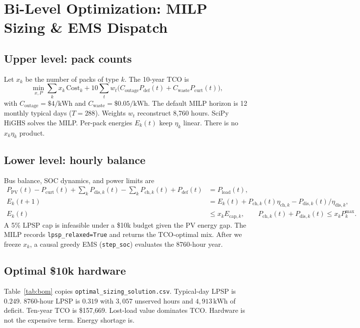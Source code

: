 \documentclass[12pt]{article}
\begin{document}
\section{Bi-Level Optimization: MILP Sizing \& EMS Dispatch}

\subsection{Upper level: pack counts}
Let \(x_k\) be the number of packs of type \(k\). The 10-year TCO is
\begin{equation}
  \min_{x,P}
  \sum_k x_k\,\mathrm{Cost}_k
  + 10\sum_t w_t
    \bigl(C_{\mathrm{outage}} P_{\mathrm{def}}(t)
          + C_{\mathrm{waste}} P_{\mathrm{curt}}(t)\bigr),
\end{equation}
with \(C_{\mathrm{outage}}=\$4/\mathrm{kWh}\) and
\(C_{\mathrm{waste}}=\$0.05/\mathrm{kWh}\). The default MILP horizon is
12 monthly typical days (\(T=288\)). Weights \(w_t\) reconstruct
8{,}760 hours. SciPy HiGHS solves the MILP. Per-pack energies \(E_k(t)\)
keep \(\eta_k\) linear. There is no \(x_k\eta_k\) product.

\subsection{Lower level: hourly balance}
Bus balance, SOC dynamics, and power limits are
\begin{align}
  P_{\mathrm{PV}}(t)-P_{\mathrm{curt}}(t)
  +\sum_k P_{\mathrm{dis},k}(t)-\sum_k P_{\mathrm{ch},k}(t)
  +P_{\mathrm{def}}(t)
  &= P_{\mathrm{load}}(t), \\
  E_k(t{+}1)
  &= E_k(t)+P_{\mathrm{ch},k}(t)\eta_{\mathrm{ch},k}
     -P_{\mathrm{dis},k}(t)/\eta_{\mathrm{dis},k}, \\
  E_k(t) &\le x_k E_{\mathrm{cap},k}, \qquad
  P_{\mathrm{ch},k}(t)+P_{\mathrm{dis},k}(t)
  \le x_k P_k^{\max}.
\end{align}
A 5\% LPSP cap is infeasible under a \$10k budget given the PV energy
gap. The MILP records \texttt{lpsp\_relaxed=True} and returns the
TCO-optimal mix. After we freeze \(x_k\), a causal greedy EMS
(\texttt{step\_soc}) evaluates the 8760-hour year.

\subsection{Optimal \$10k hardware}
Table~\ref{tab:bom} copies \texttt{optimal\_sizing\_solution.csv}.
Typical-day LPSP is \(0.249\). 8760-hour LPSP is \(0.319\) with
\(3{,}057\) unserved hours and \(4{,}913\,\mathrm{kWh}\) of deficit.
Ten-year TCO is \$157{,}669. Lost-load value dominates TCO. Hardware
is not the expensive term. Energy shortage is.
\end{document}
